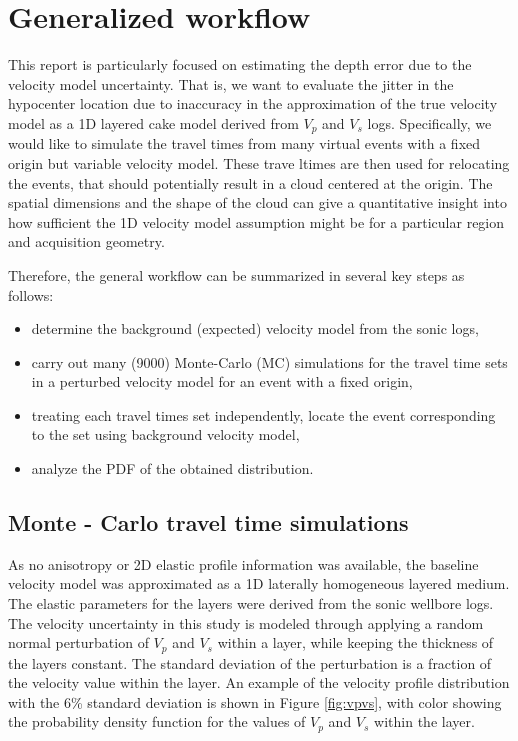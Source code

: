 \section{Generalized workflow}
This report is particularly focused on estimating the depth error due to the velocity model uncertainty. That is, we want to evaluate the jitter in the hypocenter location due to inaccuracy in the approximation of the true velocity model as a 1D layered cake model derived from $V_{p}$ and $V_{s}$ logs. Specifically, we would like to simulate the travel times from many virtual events with a fixed origin but variable velocity model. These trave ltimes are then used for relocating the events, that should potentially result in a cloud centered at the origin. The spatial dimensions and the shape of the cloud can give a quantitative insight into how sufficient the 1D velocity model assumption might be for a particular region and acquisition geometry.

Therefore, the general workflow can be summarized in several key steps as follows:
\begin{itemize}
 \item determine the background (expected) velocity model from the sonic logs,
 \item carry out many (9000) Monte-Carlo (MC) simulations for the travel time sets in a perturbed velocity model for an event with a fixed origin,
 \item treating each travel times set independently, locate the event corresponding to the set using background velocity model,
 \item analyze the PDF of the obtained distribution.
\end{itemize}



\subsection{Monte - Carlo travel time simulations}
 As no anisotropy or 2D elastic profile information was available, the baseline velocity model was approximated as a 1D laterally homogeneous layered medium. The elastic parameters for the layers were derived from the sonic wellbore logs. The velocity uncertainty in this study is modeled through applying a random normal perturbation of $V_{p}$ and $V_{s}$ within a layer, while keeping the thickness of the layers constant. The standard deviation of the perturbation is a fraction of the velocity value within the layer. An example of the velocity profile distribution with the 6\% standard deviation is shown in Figure \ref{fig:vpvs}, with color showing the probability density function for the values of $V_{p}$ and $V_{s}$ within the layer.

